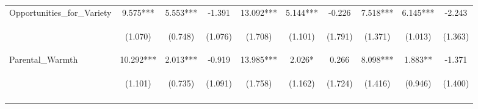 \begin{tabular}{lccccccccc}
\noalign{\smallskip}Opportunities_for_Variety & 9.575*** & 5.553*** & -1.391 & 13.092*** & 5.144*** & -0.226 & 7.518*** & 6.145*** & -2.243\\
 & \begin{footnotesize}(1.070)\end{footnotesize} & \begin{footnotesize}(0.748)\end{footnotesize} & \begin{footnotesize}(1.076)\end{footnotesize} & \begin{footnotesize}(1.708)\end{footnotesize} & \begin{footnotesize}(1.101)\end{footnotesize} & \begin{footnotesize}(1.791)\end{footnotesize} & \begin{footnotesize}(1.371)\end{footnotesize} & \begin{footnotesize}(1.013)\end{footnotesize} & \begin{footnotesize}(1.363)\end{footnotesize}\\
\noalign{\smallskip}Parental_Warmth & 10.292*** & 2.013*** & -0.919 & 13.985*** & 2.026* & 0.266 & 8.098*** & 1.883** & -1.371\\
 & \begin{footnotesize}(1.101)\end{footnotesize} & \begin{footnotesize}(0.735)\end{footnotesize} & \begin{footnotesize}(1.091)\end{footnotesize} & \begin{footnotesize}(1.758)\end{footnotesize} & \begin{footnotesize}(1.162)\end{footnotesize} & \begin{footnotesize}(1.724)\end{footnotesize} & \begin{footnotesize}(1.416)\end{footnotesize} & \begin{footnotesize}(0.946)\end{footnotesize} & \begin{footnotesize}(1.400)\end{footnotesize}\\
\noalign{\smallskip}\hline\end{tabular}\\
